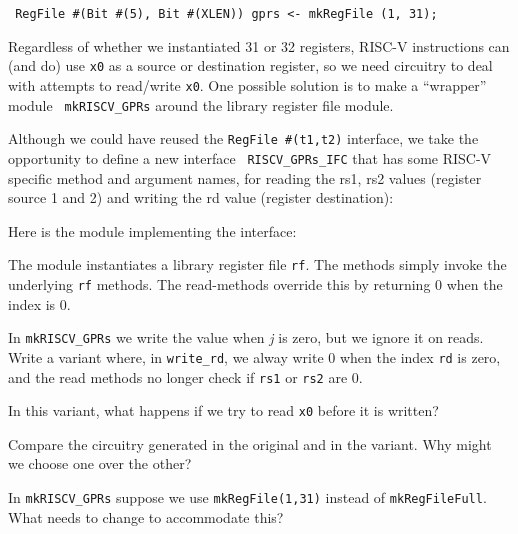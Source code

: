 \begin{tabbing}\small\tt
\hmm RegFile \#(Bit \#(5), Bit \#(XLEN)) gprs <- mkRegFile (1, 31);
\end{tabbing}

Regardless of whether we instantiated 31 or 32 registers, RISC-V
instructions can (and do) use {\tt x0} as a source or destination
register, so we need circuitry to deal with attempts to read/write
{\tt x0}.  One possible solution is to make a ``wrapper'' module {\tt
mkRISCV\_GPRs} around the library register file module.

Although we could have reused the {\tt RegFile \#(t1,t2)} interface,
we take the opportunity to define a new interface {\tt
RISCV\_GPRs\_IFC} that has some RISC-V specific method and argument
names, for reading the rs1, rs2 values (register source 1 and 2) and
writing the rd value (register destination):





Here is the module implementing the interface:



The module instantiates a library register file {\tt rf}.  The methods
simply invoke the underlying {\tt rf} methods.  The read-methods
override this by returning 0 when the index is 0.

\hdivider

\Exercise
\hm In {\tt mkRISCV\_GPRs} we write the value when \emph{j} is zero,
but we ignore it on reads.  Write a variant where, in {\tt write\_rd},
we alway write 0 when the index {\tt rd} is zero, and the read methods
no longer check if {\tt rs1} or {\tt rs2} are 0.

In this variant, what happens if we try to read {\tt x0} before it is
written?

Compare the circuitry generated in the original and in the variant.
Why might we choose one over the other?

\Exercise
\hm In {\tt mkRISCV\_GPRs} suppose we use {\tt mkRegFile(1,31)} instead of
{\tt mkRegFileFull}.  What needs to change to accommodate this?

\Endexercise


